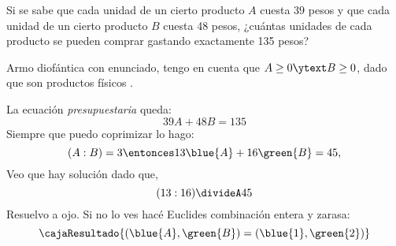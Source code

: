 \begin{enunciado}{\ejercicio}
  Si se sabe que cada unidad de un cierto producto $A$ cuesta $39$ pesos y que cada unidad de un cierto
  producto $B$ cuesta 48 pesos, ¿cuántas unidades de cada producto se pueden comprar gastando exactamente
  135 pesos?
\end{enunciado}

Armo diofántica con enunciado, tengo en cuenta que
$A \geq 0 \ytext B \geq 0$, dado que son productos físicos {}.

La ecuación \textit{presupuestaria} queda:
$$
  39A + 48B = 135
$$
Siempre que puedo coprimizar lo hago:
$$
  (A:B) = 3
  \entonces
  13 \blue{A} + 16\green{B} = 45,
$$
Veo que hay solución dado que,
$$
  (13:16) \divideA 45
$$
Resuelvo a ojo. Si no lo ves hacé Euclides combinación entera y zarasa:
$$
  \cajaResultado{
    (\blue{A},\green{B}) = (\blue{1},\green{2})
  }
$$

\begin{aportes}
  \item {}
\end{aportes}
